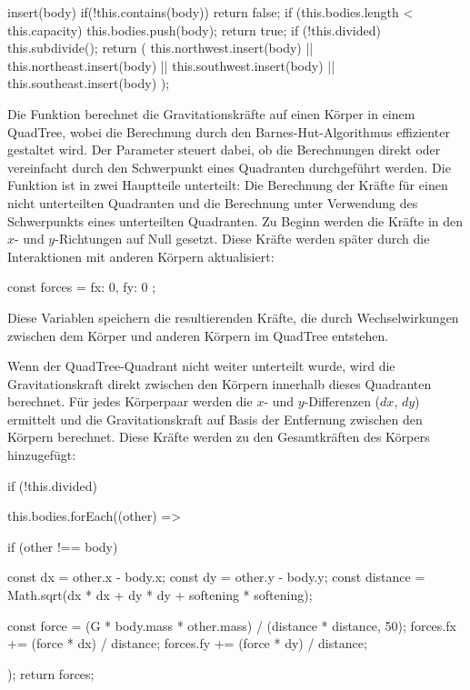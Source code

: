 \documentclass[a4paper,12pt,twoside]{article}
\begin{document}
\begin{javascript}
insert(body) {
    if(!this.contains(body)) return false;
    if (this.bodies.length < this.capacity) {
        this.bodies.push(body);
        return true;
    }
    if (!this.divided) this.subdivide();
    return (
        this.northwest.insert(body) ||
        this.northeast.insert(body) ||
        this.southwest.insert(body) ||
        this.southeast.insert(body)
    );
}
\end{javascript}


Die Funktion  berechnet die Gravitationskräfte auf 
einen Körper  in einem QuadTree, wobei die Berechnung durch den 
Barnes-Hut-Algorithmus effizienter gestaltet wird. Der Parameter  steuert dabei, ob die Berechnungen direkt oder vereinfacht durch den Schwerpunkt eines Quadranten durchgeführt werden. Die Funktion ist in zwei Hauptteile unterteilt: Die Berechnung der Kräfte für einen nicht unterteilten Quadranten und die Berechnung unter Verwendung des Schwerpunkts eines unterteilten Quadranten.
Zu Beginn werden die Kräfte in den \( x \)- und \( y \)-Richtungen auf Null gesetzt. 
Diese Kräfte werden später durch die Interaktionen mit anderen Körpern aktualisiert:

\begin{javascript}
const forces = { fx: 0, fy: 0 };
\end{javascript}

Diese Variablen speichern die resultierenden Kräfte, die durch Wechselwirkungen 
zwischen dem Körper und anderen Körpern im QuadTree entstehen.

Wenn der QuadTree-Quadrant nicht weiter unterteilt wurde, wird die Gravitationskraft 
direkt zwischen den Körpern innerhalb dieses Quadranten berechnet. Für jedes Körperpaar 
werden die \( x \)- und \( y \)-Differenzen (\( dx \), \( dy \)) ermittelt und die 
Gravitationskraft auf Basis der Entfernung zwischen den Körpern berechnet. Diese Kräfte 
werden zu den Gesamtkräften des Körpers hinzugefügt:

\begin{javascript}
if (!this.divided) {
    this.bodies.forEach((other) => {
        if (other !== body) {
            const dx = other.x - body.x;
            const dy = other.y - body.y;
            const distance = Math.sqrt(dx * dx + dy * dy + softening * softening);
            
            const force = (G * body.mass * other.mass) / (distance * distance, 50);
            forces.fx += (force * dx) / distance;
            forces.fy += (force * dy) / distance;
        }
    });
    return forces;
}
\end{javascript}
\end{document}
